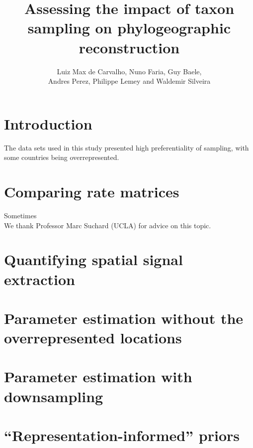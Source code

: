 \documentclass[a4paper,10pt]{article}
\title{Assessing the impact of taxon sampling on phylogeographic reconstruction} %
\author{
Luiz Max de Carvalho, Nuno Faria, Guy Baele,\\ 
Andres Perez, Philippe Lemey and Waldemir Silveira 
}
\begin{document}
\maketitle

\section{Introduction}
The data sets used in this study presented high preferentiality of sampling, with some countries being overrepresented.
\section{Comparing rate matrices}
Sometimes \\
We thank Professor Marc Suchard (UCLA) for advice on this topic.\\
\section{Quantifying spatial signal extraction}
\section{Parameter estimation without the overrepresented locations}
\section{Parameter estimation with downsampling}
\section{``Representation-informed'' priors}
\newpage

\end{document}
